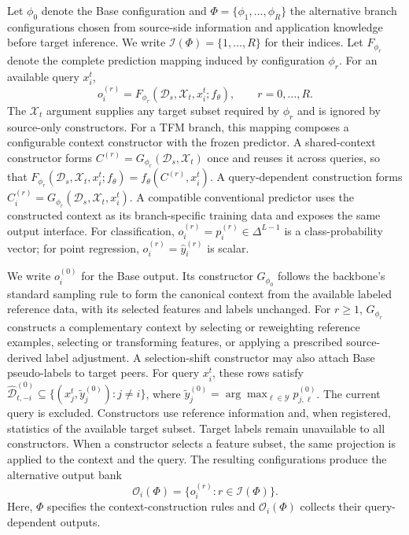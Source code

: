 Let $\phi_0$ denote the Base configuration and
$\Phi=\{\phi_1,\ldots,\phi_R\}$ the alternative branch configurations chosen
from source-side information and application knowledge before target inference.
We write $\mathcal I(\Phi)=\{1,\ldots,R\}$ for their indices. Let
$F_{\phi_r}$ denote the complete prediction mapping induced by configuration
$\phi_r$. For an available query $x_i^t$,
\begin{equation}
  o_i^{(r)}
  =F_{\phi_r}(\mathcal D_s,\mathcal X_t,x_i^t;f_\theta),
  \qquad r=0,\ldots,R.
  \label{eq:context_prediction}
\end{equation}
The $\mathcal X_t$ argument supplies any target subset required by $\phi_r$ and
is ignored by source-only constructors.
For a TFM branch, this mapping composes a configurable context constructor
with the frozen predictor. A shared-context constructor forms
$C^{(r)}=G_{\phi_r}(\mathcal D_s,\mathcal X_t)$ once and reuses it across
queries, so that
$F_{\phi_r}(\mathcal D_s,\mathcal X_t,x_i^t;f_\theta)
=f_\theta(C^{(r)},x_i^t)$. A query-dependent construction forms
$C_i^{(r)}=G_{\phi_r}(\mathcal D_s,\mathcal X_t,x_i^t)$. A compatible conventional predictor uses the
constructed context as its branch-specific training data and exposes the same
output interface. For classification,
$o_i^{(r)}=p_i^{(r)}\in\Delta^{L-1}$ is a class-probability vector; for point regression,
$o_i^{(r)}=\hat y_i^{(r)}$ is scalar.

We write $o_i^{(0)}$ for the Base output.
Its constructor $G_{\phi_0}$ follows the backbone's standard sampling rule to
form the canonical context from the available labeled reference data, with its
selected features and labels unchanged. For
$r\geq1$, $G_{\phi_r}$ constructs a complementary context by selecting or
reweighting reference examples, selecting or transforming features, or
applying a prescribed source-derived label adjustment. A selection-shift
constructor may also attach Base pseudo-labels to target peers. For query
$x_i^t$, these rows satisfy
$\widehat{\mathcal D}_{t,-i}^{(0)}\subseteq
\{(x_j^t,\widetilde y_j^{(0)}):j\neq i\}$, where
$\widetilde y_j^{(0)}=\arg\max_{\ell\in\mathcal Y}p_{j,\ell}^{(0)}$. The
current query is excluded. Constructors use reference information and, when
registered, statistics of the available target subset. Target
labels remain unavailable to all constructors. When a constructor selects a
feature subset, the same
projection is applied to the context and the query. The resulting
configurations produce the alternative output bank
\begin{equation}
  \mathcal O_i(\Phi)=\{o_i^{(r)}:r\in\mathcal I(\Phi)\}.
  \label{eq:output_bank}
\end{equation}
Here, $\Phi$ specifies the context-construction rules and
$\mathcal O_i(\Phi)$ collects their query-dependent outputs.

